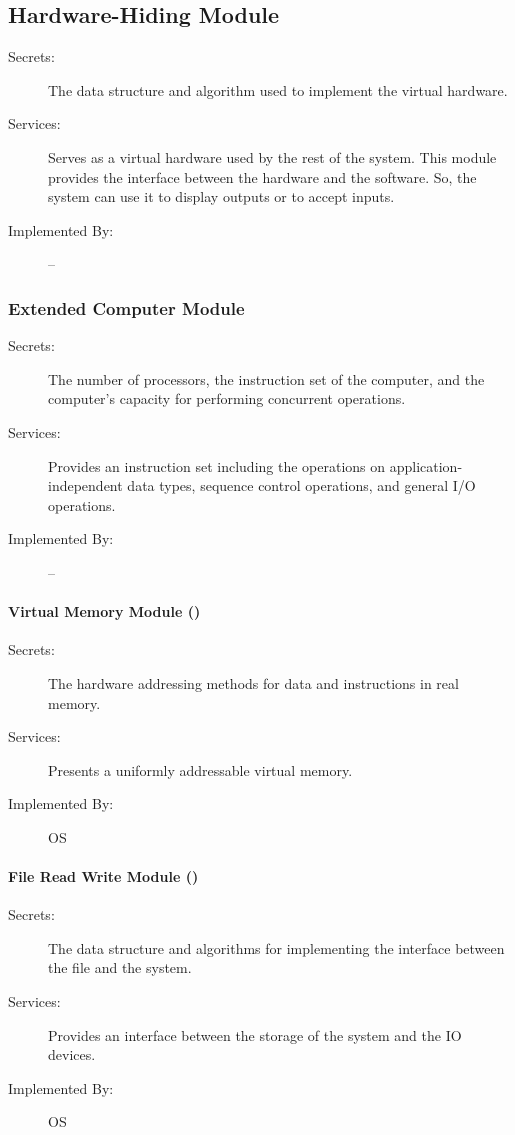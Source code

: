 \documentclass[12pt,titlepage]{article}
\begin{document}
\subsection{Hardware-Hiding Module}
\begin{description}
\item[Secrets:]The data structure and algorithm used to implement the virtual hardware.
\item[Services:]Serves as a virtual hardware used by the rest of the system. This module provides the interface between the hardware and the software. So, the system can use it to display outputs or to accept inputs.
\item[Implemented By:] --  
\end{description}

\subsubsection{Extended Computer Module}
\begin{description}
\item[Secrets:]The number of processors, the instruction set of the computer, and the computer's capacity for performing concurrent operations.
\item[Services:]Provides an instruction set including the operations on application-independent data types, sequence control operations, and general I/O operations.
\item[Implemented By:] --
\end{description}

\paragraph{Virtual Memory Module ()}
\begin{description}
\item[Secrets:]The hardware addressing methods for data and instructions in real memory. 
\item[Services:]Presents a uniformly addressable virtual memory.
\item[Implemented By:] OS
\end{description}

\paragraph{File Read Write Module ()}
\begin{description}
\item[Secrets:]The data structure and algorithms for implementing the interface between the file and the system.
\item[Services:]Provides an interface between the storage of the system and the IO devices.
\item[Implemented By:] OS
\end{description}
\end{document}
